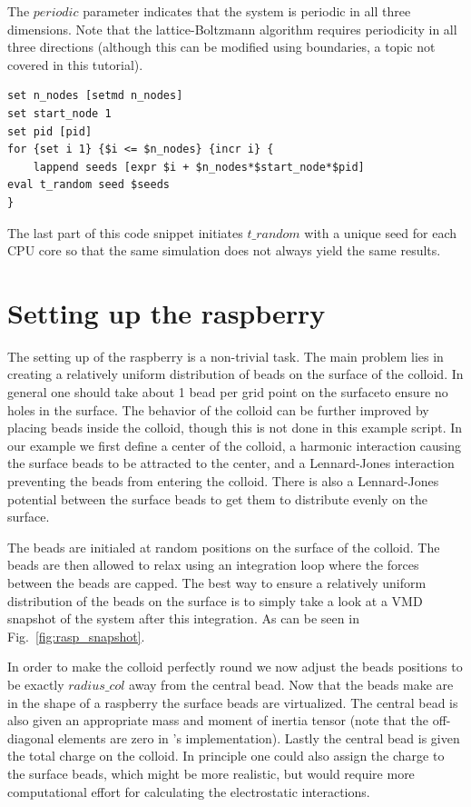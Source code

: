 \documentclass[
paper=a4,                       %
fontsize=11pt,                  %
twoside,                        %
footsepline,                    %
headsepline,                    %
headinclude=false,              %
footinclude=false,              %
pagesize,                       %
]{scrartcl}
\begin{document}
The $periodic$ parameter indicates that the system is periodic in all three
dimensions. Note that the lattice-Boltzmann algorithm requires periodicity in all three directions (although
this can be modified using boundaries, a topic not covered in this tutorial). 
{\small\vspace{0,2cm}
\begin{lstlisting}[numbers=none]
set n_nodes [setmd n_nodes]
set start_node 1
set pid [pid]
for {set i 1} {$i <= $n_nodes} {incr i} {
    lappend seeds [expr $i + $n_nodes*$start_node*$pid]
eval t_random seed $seeds
}\end{lstlisting}\vspace{0,2cm}
}
The last part of this code snippet initiates $t\_random$ with
a unique seed for each CPU core so that the same simulation does not always yield the same results.

\section{Setting up the raspberry}

The setting up of the raspberry is a non-trivial task. The main problem lies in creating a relatively
uniform distribution of beads on the surface of the colloid. In general one should take about 1 bead per grid
point on the surfaceto ensure no holes in the surface. The behavior of the colloid can be further improved by placing
beads inside the colloid, though this is not done in this example script. In our example
we first define a center of the colloid, a harmonic interaction causing the surface beads to be attracted
to the center, and a Lennard-Jones interaction preventing the beads from entering the colloid. There is also a Lennard-Jones
potential between the surface beads to get them to distribute evenly on the surface. 

The beads are initialed at random positions on the surface of the colloid. The beads are then allowed to relax using
an integration loop where the forces between the beads are capped. The best way to ensure a relatively uniform distribution
of the beads on the surface is to simply take a look at a VMD snapshot of the system after this integration. As can
be seen in Fig.~\ref{fig:rasp_snapshot}.

In order to make the colloid perfectly round we now adjust the beads positions to be exactly $radius\_col$ away
from the central bead.
Now that the beads make are in the shape of a raspberry the surface beads are virtualized. The central
bead is also given an appropriate mass and moment of inertia tensor (note that the off-diagonal elements
are zero in \es{}'s implementation). Lastly the central bead is given the total charge on the colloid. In principle
one could also assign the charge to the surface beads, which might be more realistic, but would require more computational
effort for calculating the electrostatic interactions.
\end{document}
